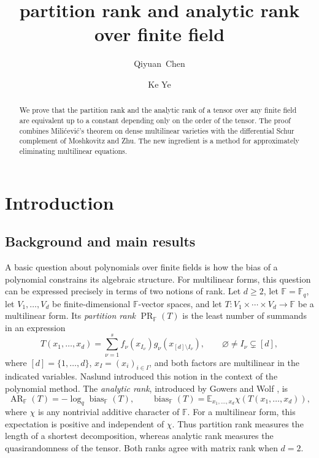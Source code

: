 \documentclass[11pt,reqno]{amsart}
\theoremstyle{plain}
\theoremstyle{definition}
\newcommand{\F}{\mathbb F}
\newcommand{\E}{\mathbb E}
\DeclareMathOperator{\bias}{bias}
\DeclareMathOperator{\arank}{AR}
\DeclareMathOperator{\prank}{PR}
\begin{document}
\title{partition rank and analytic rank over finite field}
\date{}
\author[Q-Y.~Chen]{Qiyuan~Chen}
\address{Korteweg-de Vries Institute for Mathematics, University of Amsterdam,
P.O. Box 94248, 1090 GE Amsterdam, The Netherlands}
\author[K.~Ye]{Ke Ye}
\address{State Key Laboratory of Mathematical Sciences, Academy of Mathematics and Systems Science, Chinese Academy of Sciences, Beijing 100190, China}
\begin{abstract}
We prove that the partition rank and the analytic rank of a tensor over any finite field are equivalent up to a constant depending only on the order of the tensor. The proof combines Mili\'cevi\'c's theorem on dense multilinear varieties with the differential Schur complement of Moshkovitz and Zhu. The new ingredient is a method for approximately eliminating multilinear equations.
\end{abstract}
\maketitle
\section{Introduction}\label{sec:intro}
\subsection{Background and main results}
A basic question about polynomials over finite fields is how the bias of a polynomial constrains its algebraic structure. For multilinear
forms, this question can be expressed precisely in terms of two notions of rank.
Let $d\geq 2$, let $\F=\mathbb F_q$, let $V_1,\ldots,V_d$ be finite-dimensional
$\F$-vector spaces, and let $T\colon V_1\times\cdots\times V_d\to\F$
be a multilinear form. Its \emph{partition rank} $\prank_{\F}(T)$ is
the least number of summands in an expression
\[
 T(x_1,\ldots,x_d)=\sum_{\nu=1}^s
 f_\nu(x_{I_\nu})g_\nu(x_{[d]\setminus I_\nu}),
 \qquad \varnothing\ne I_\nu\subsetneq[d],
\]
where $[d]=\{1,\ldots,d\}$, $x_I=(x_i)_{i\in I}$, and both factors
are multilinear in the indicated variables. Naslund \cite{Naslund} introduced
this notion in the context of the polynomial method. The
\emph{analytic rank}, introduced by Gowers and Wolf \cite{GowersWolf}, is
\[
 \arank_{\F}(T)=-\log_q\bias_{\F}(T),\qquad
 \bias_{\F}(T)=\E_{x_1,\ldots,x_d}\chi(T(x_1,\ldots,x_d)),
\]
where $\chi$ is any nontrivial additive character of $\F$. For a
multilinear form, this expectation is positive and independent of
$\chi$. Thus partition rank measures the length of a shortest decomposition,
whereas analytic rank measures the quasirandomness of the tensor. Both ranks agree with matrix rank when $d=2$.
\end{document}
